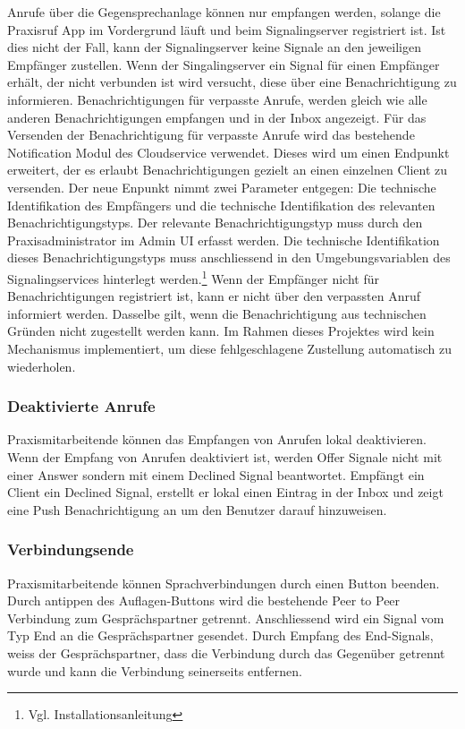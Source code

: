 Anrufe über die Gegensprechanlage können nur empfangen werden, solange die Praxisruf App im Vordergrund läuft und beim Signalingserver registriert ist.
Ist dies nicht der Fall, kann der Signalingserver keine Signale an den jeweiligen Empfänger zustellen.
Wenn der Singalingserver ein Signal für einen Empfänger erhält, der nicht verbunden ist wird versucht, diese über eine Benachrichtigung zu informieren.
Benachrichtigungen für verpasste Anrufe, werden gleich wie alle anderen Benachrichtigungen empfangen und in der Inbox angezeigt.
Für das Versenden der Benachrichtigung für verpasste Anrufe wird das bestehende Notification Modul des Cloudservice verwendet.
Dieses wird um einen Endpunkt erweitert, der es erlaubt Benachrichtigungen gezielt an einen einzelnen Client zu versenden.
Der neue Enpunkt nimmt zwei Parameter entgegen:
Die technische Identifikation des Empfängers und die technische Identifikation des relevanten Benachrichtigungstyps.
Der relevante Benachrichtigungstyp muss durch den Praxisadministrator im Admin UI erfasst werden.
Die technische Identifikation dieses Benachrichtigungstyps muss anschliessend in den Umgebungsvariablen des Signalingservices hinterlegt werden.\footnote{Vgl. Installationsanleitung}
Wenn der Empfänger nicht für Benachrichtigungen registriert ist, kann er nicht über den verpassten Anruf informiert werden.
Dasselbe gilt, wenn die Benachrichtigung aus technischen Gründen nicht zugestellt werden kann.
Im Rahmen dieses Projektes wird kein Mechanismus implementiert, um diese fehlgeschlagene Zustellung automatisch zu wiederholen.

\subsubsection{Deaktivierte Anrufe}

Praxismitarbeitende können das Empfangen von Anrufen lokal deaktivieren.
Wenn der Empfang von Anrufen deaktiviert ist, werden Offer Signale nicht mit einer Answer sondern mit einem Declined Signal beantwortet.
Empfängt ein Client ein Declined Signal, erstellt er lokal einen Eintrag in der Inbox und zeigt eine Push Benachrichtigung an um den Benutzer darauf hinzuweisen.


\subsubsection{Verbindungsende}

Praxismitarbeitende können Sprachverbindungen durch einen Button beenden.
Durch antippen des Auflagen-Buttons wird die bestehende Peer to Peer Verbindung zum Gesprächspartner getrennt.
Anschliessend wird ein Signal vom Typ End an die Gesprächspartner gesendet.
Durch Empfang des End-Signals, weiss der Gesprächspartner, dass die Verbindung durch das Gegenüber getrennt wurde und kann die Verbindung seinerseits entfernen.

\clearpage
